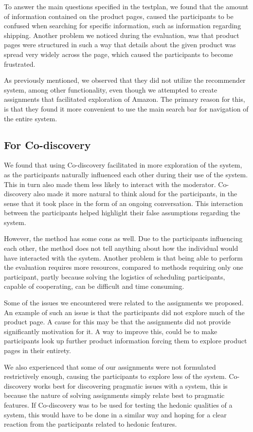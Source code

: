 To answer the main questions specified in the testplan, we found that the amount of information contained on the product pages, caused the participants to be confused when searching for specific information, such as information regarding shipping. Another problem we noticed during the evaluation, was that product pages were structured in such a way that details about the given product was spread very widely across the page, which caused the participants to become frustrated.

As previously mentioned, we observed that they did not utilize the recommender system, among other functionality, even though we attempted to create assignments that facilitated exploration of Amazon. The primary reason for this, is that they found it more convenient to use the main search bar for navigation of the entire system. 

\subsection{For Co-discovery}
We found that using Co-discovery facilitated in more exploration of the system, as the participants naturally influenced each other during their use of the system. This in turn also made them less likely to interact with the moderator. Co-discovery also made it more natural to think aloud for the participants, in the sense that it took place in the form of an ongoing conversation. This interaction between the participants helped highlight their false assumptions regarding the system. 

However, the method has some cons as well. Due to the participants influencing each other, the method does not tell anything about how the individual would have interacted with the system. Another problem is that being able to perform the evaluation requires more resources, compared to methods requiring only one participant, partly because solving the logistics of scheduling participants, capable of cooperating, can be difficult and time consuming.

Some of the issues we encountered were related to the assignments we proposed. An example of such an issue is that the participants did not explore much of the product page. A cause for this may be that the assignments did not provide significantly motivation for it. A way to improve this, could be to make participants look up further product information forcing them to explore product pages in their entirety. 

We also experienced that some of our assignments were not formulated restrictively enough, causing the participants to explore less of the system.
Co-discovery works best for discovering pragmatic issues with a system, this is because the nature of solving assignments simply relate best to pragmatic features. If Co-discovery was to be used for testing the hedonic qualities of a system, this would have to be done in a similar way and hoping for a clear reaction from the participants related to hedonic features.


